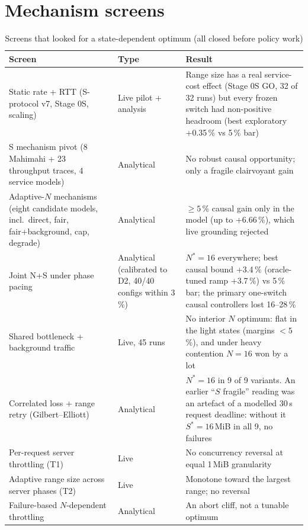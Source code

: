 \section{Mechanism screens}
\begin{table}[H]\centering\small
\caption{Screens that looked for a state-dependent optimum (all closed before policy work)}\label{tab:screens}
\begin{tabularx}{\linewidth}{@{}P{4.4cm}P{2.0cm}L@{}}
\toprule
\textbf{Screen} & \textbf{Type} & \textbf{Result}\\
\midrule
Static rate + RTT (S-protocol v7, Stage 0S, scaling) & Live pilot + analysis & Range size has a real service-cost effect (Stage 0S GO, 32 of 32 runs) but every frozen switch had non-positive headroom (best exploratory +0.35\,\% vs 5\,\% bar)\\
S mechanism pivot (8 Mahimahi + 23 throughput traces, 4 service models) & Analytical & No robust causal opportunity; only a fragile clairvoyant gain\\
Adaptive-$N$ mechanisms (eight candidate models, incl.\ direct, fair, fair+background, cap, degrade) & Analytical & $\ge5$\,\% causal gain only in the  model (up to +6.66\,\%), which live grounding rejected\\
Joint N+S under phase pacing & Analytical (calibrated to D2, 40/40 configs within 3\,\%) & $N^*=16$ everywhere; best causal bound +3.4\,\% (oracle-tuned ramp +3.7\,\%) vs 5\,\% bar; the primary one-switch causal controllers lost 16--28\,\%\\
Shared bottleneck +  background traffic & Live, 45 runs & No interior $N$ optimum: flat in the light states (margins $<5$\,\%), and under heavy contention $N=16$ won by a lot\\
Correlated loss + range retry (Gilbert--Elliott) & Analytical & $N^*=16$ in 9 of 9 variants. An earlier ``$S$ fragile'' reading was an artefact of a modelled 30\,s request deadline: without it $S^*=16$\,MiB in all 9, no failures\\
Per-request server throttling (T1) & Live & No concurrency reversal at equal 1\,MiB granularity\\
Adaptive range size across server phases (T2) & Live & Monotone toward the largest range; no reversal\\
Failure-based $N$-dependent throttling & Analytical & An abort cliff, not a tunable optimum\\
\bottomrule
\end{tabularx}
\end{table}

